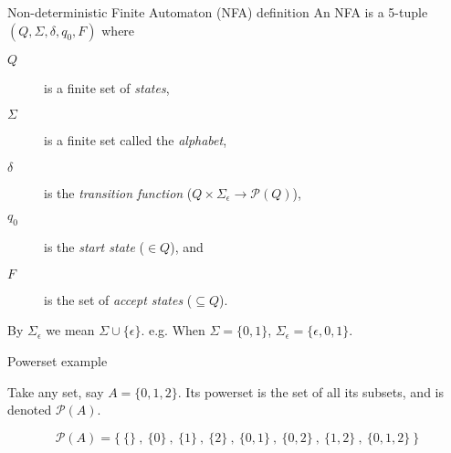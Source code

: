\documentclass{beamer}
\begin{document}
  
  \begin{frame}[fragile]{Non-deterministic Finite Automaton (NFA) definition}
    An NFA is a 5-tuple \( (Q,\Sigma,\delta,q_0,F) \) where
    \begin{description}
      \item[\( Q \)] is a finite set of \emph{states},
      \item[\( \Sigma \)] is a finite set called the \emph{alphabet},
      \item[\( \delta \)] is the \emph{transition function} (\( Q \times \Sigma_{\epsilon} \rightarrow \mathcal{P}(Q) \)),
      \item[\( q_0 \)] is the \emph{start state} (\( \in Q \)), and
      \item[\( F \)] is the set of \emph{accept states} (\( \subseteq Q \)). 
    \end{description}
    \vspace{5mm}
    By \( \Sigma_{\epsilon} \) we mean \( \Sigma \cup \{ \epsilon \} \).
    e.g. When \( \Sigma = \{0,1\} \), \( \Sigma_{\epsilon} = \{\epsilon,0,1\}. \)
  \end{frame}
  
  \begin{frame}[fragile]{Powerset example}
  
    Take any set, say \( A = \{0,1,2\} \).
    Its powerset is the set of all its subsets, and is denoted \( \mathcal{P}(A) \).
  
  
    \[
    \mathcal{P}(A) = \Big\{ \ 
                        \{ \} \  , \  \{ 0 \} \  , \  \{ 1 \} \  ,\   \{ 2 \} \  , \ 
                        \{ 0,1 \} \  , \  \{ 0,2 \} \  , \  \{ 1,2 \} \  , \ 
                        \{ 0,1,2 \} \ 
                      \Big\}
    \]
  
  \end{frame}
  
  \vspace{2mm}
  
\end{document}
